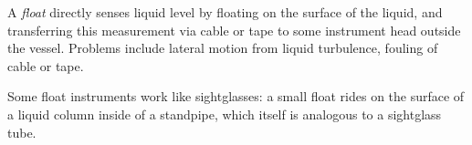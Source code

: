 \vskip 10pt

A {\it float} directly senses liquid level by floating on the surface of the liquid, and transferring this measurement via cable or tape to some instrument head outside the vessel.  Problems include lateral motion from liquid turbulence, fouling of cable or tape.

Some float instruments work like sightglasses: a small float rides on the surface of a liquid column inside of a standpipe, which itself is analogous to a sightglass tube.




